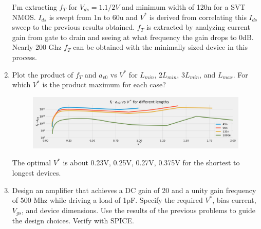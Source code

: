 \begin{enumerate}
    I'm extracting $f_T$ for $V_{ds} = 1.1/2 V$ and minimum width of 120n for a SVT NMOS. $I_{ds}$ is swept from 1n to 60u and $V^*$ is derived from correlating this $I_{ds}$ sweep to the previous results obtained. $f_T$ is extracted by analyzing current gain from gate to drain and seeing at what frequency the gain drops to 0dB. Nearly 200 Ghz $f_T$ can be obtained with the minimally sized device in this process.

\item {\color{blue}Plot the product of $f_T$ and $a_{v0}$ vs $V^*$ for $L_{min}$, $2 L_{min}$, $3 L_{min}$, and $L_{max}$. For which $V^*$ is the product maximum for each case?}

    \begin{figure}[H]
        \centering
        \includegraphics[width=\textwidth]{figs/problem11.png}
    \end{figure}

    The optimal $V^*$ is about 0.23V, 0.25V, 0.27V, 0.375V for the shortest to longest devices.

\item {\color{blue} Design an amplifier that achieves a DC gain of 20 and a unity gain frequency of 500 Mhz while driving a load of 1pF. Specify the required $V^*$, bias current, $V_{gs}$, and device dimensions. Use the results of the previous problems to guide the design choices. Verify with SPICE.}
\end{enumerate}

